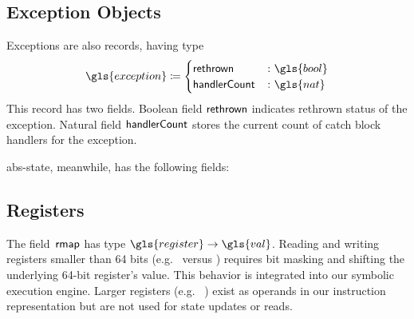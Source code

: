 \subsection{Exception Objects}
\begin{definition}
  Exceptions are also records, having type
  \begin{equation*}
    \gls{exception}\coloneqq\begin{cases}
      \rethrown &\colon \gls{bool} \\
      \handlerCount &\colon \gls{nat}
    \end{cases}
  \end{equation*}
  This record has two fields.
  Boolean field $\mathsf{rethrown}$ indicates rethrown status of the exception.
  Natural field $\mathsf{handlerCount}$ stores the current count of catch block handlers for the exception.
\end{definition}
\Gls{abs-state}, meanwhile, has the following fields:

\subsection{Registers}
The field~$\operatorname{\mathsf{rmap}}$ has type $\gls{register}\to\gls{val}$.
Reading and writing registers smaller than 64 bits (e.g.\  versus ) requires bit masking and shifting the underlying 64-bit register's value.
This behavior is integrated into our symbolic execution engine.
Larger registers (e.g.\ %
) exist as operands in our instruction representation but are not used for state updates or reads.

